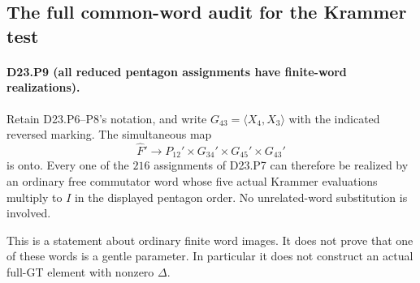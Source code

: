 \subsection{The full common-word audit for the Krammer test}

\paragraph{D23.P9 (all reduced pentagon assignments have finite-word realizations).}
Retain D23.P6--P8's notation, and write
$G_{43}=\langle X_4,X_3\rangle$ with the indicated reversed
marking. The simultaneous map
\[
 \widehat F'\longrightarrow
 P_{12}'\times G_{34}'\times G_{45}'\times G_{43}'
\tag{D23.P9.1}
\]
is onto. Every one of the $216$ assignments of D23.P7 can
therefore be realized by an ordinary free commutator word whose
five actual Krammer evaluations multiply to $I$ in the displayed
pentagon order. No unrelated-word substitution is involved.

This is a statement about ordinary finite word images. It does
not prove that one of these words is a gentle parameter. In
particular it does not construct an actual full-GT element with
nonzero $\Delta$.

